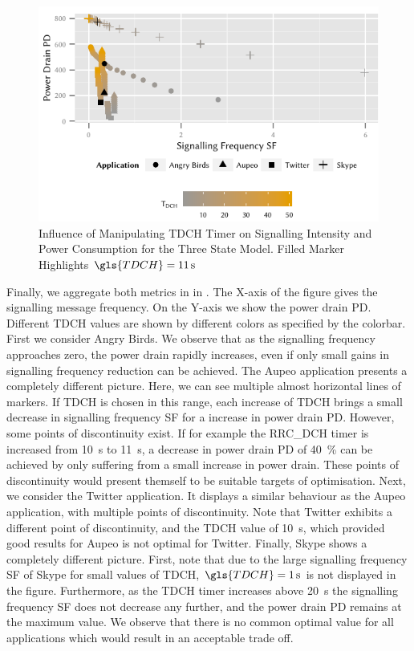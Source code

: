 \begin{figure}
	\centering
	\includegraphics{network/network_traces/numerical_results/figures/3_state_signalling_vs_power_consumption}
	\caption{Influence of Manipulating \gls{TDCH} Timer on Signalling Intensity and Power Consumption for the Three State Model. Filled Marker Highlights \(\gls{TDCH} = \SI{11}{\second}\)}\label{fig:network:network_traces:numerical_results:three_states:trade_off}
\end{figure}
Finally, we aggregate both metrics in in .
The X-axis of the figure gives the signalling message frequency.
On the Y-axis we show the power drain \gls{PD}.
Different \gls{TDCH} values are shown by different colors as specified by the colorbar.
First we consider Angry Birds.
We observe that as the signalling frequency approaches zero, the power drain rapidly increases, even if only small gains in signalling frequency reduction can be achieved.
The Aupeo application presents a completely different picture.
Here, we can see multiple almost horizontal lines of markers.
If \gls{TDCH} is chosen in this range, each increase of \gls{TDCH} brings a small decrease in signalling frequency \gls{SF} for a increase in power drain \gls{PD}.
However, some points of discontinuity exist.
If for example the \gls{RRC_DCH} timer is increased from \SI{10}{\second} to \SI{11}{\second}, a decrease in power drain \gls{PD} of \SI{40}{\percent} can be achieved by only suffering from a small increase in power drain.
These points of discontinuity would present themself to be suitable targets of optimisation.
Next, we consider the Twitter application.
It displays a similar behaviour as the Aupeo application, with multiple points of discontinuity.
Note that Twitter exhibits a different point of discontinuity, and the \gls{TDCH} value of \SI{10}{\second}, which provided good results for Aupeo is not optimal for Twitter.
Finally, Skype shows a completely different picture.
First, note that due to the large signalling frequency \gls{SF} of Skype for small values of \gls{TDCH}, \(\gls{TDCH} = \SI{1}{\second}\) is not displayed in the figure.
Furthermore, as the \gls{TDCH} timer increases above \SI{20}{\second} the signalling frequency \gls{SF} does not decrease any further, and the power drain \gls{PD} remains at the maximum value.
We observe that there is no common optimal value for all applications which would result in an acceptable trade off.


